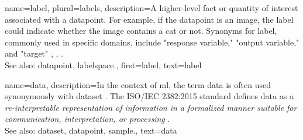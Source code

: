 {name={label}, plural={labels},
	description={A higher-level fact or quantity of interest associated 
	with a \gls{datapoint}. For example, if the \gls{datapoint} is an image, the label 
	could indicate whether the image contains a cat or not. Synonyms for label, commonly 
	used in specific domains, include "response variable," "output variable," and "target" \cite{Gujarati2021}, \cite{Dodge2003}, \cite{Everitt2010}.
				\\
		See also: \gls{datapoint}, \gls{labelspace}.},
	first={label},
	text={label}  
}


{name={data},
 description={In the context of \gls{ml}, the term 
 data is often used synonymously with \gls{dataset}
  \cite{Everitt2010,OxfordStatisticsDictionary}. 
  The ISO/IEC 2382:2015 standard defines data as a \emph{re-interpretable representation of 
  information in a formalized manner suitable for communication, interpretation, 
  or processing} \cite{ISO2382}. 
  \\
  See also: \gls{dataset}, \gls{datapoint}, \gls{sample}.}, 
  text={data}
}
		
